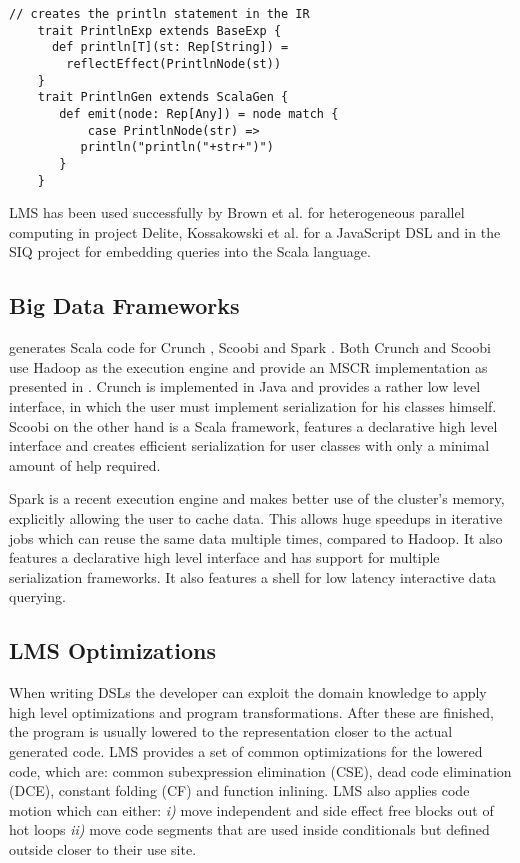 \begin{lstlisting}[name=code, caption=Example of how the DSL module is specified. This module is used for measuring a performance of a block of code and can be reused in any other Scala backed DSL. ,captionpos=b, label=lst:println_dsl, float=t]
    // creates the println statement in the IR
    trait PrintlnExp extends BaseExp {
      def println[T](st: Rep[String]) =
        reflectEffect(PrintlnNode(st)) 
    }
    trait PrintlnGen extends ScalaGen {
       def emit(node: Rep[Any]) = node match {
           case PrintlnNode(str) =>
	      println("println("+str+")")
       }
    }
\end{lstlisting}

LMS has been used successfully by Brown et al. for heterogeneous parallel computing in project Delite\cite{brown_heterogeneous_2011}, Kossakowski et al. for a JavaScript DSL  and in the SIQ project for embedding queries into the Scala language.
\subsection{Big Data Frameworks}
\label{subsed:big-data-frameworks}
\tool generates Scala code for Crunch \cite{_crunch_2012}, Scoobi \cite{nicta_scoobi_2012} and Spark \cite{matei_spark_????}. Both Crunch and Scoobi use Hadoop as the execution engine and provide an MSCR implementation as presented in \cite{chambers_flumejava:_2010}. Crunch is implemented in Java and provides a rather low level interface, in which the user must implement serialization for his classes himself. Scoobi on the other hand is a Scala framework, features a declarative high level interface and creates efficient serialization for user classes with only a minimal amount of help required. 

Spark is a recent execution engine and makes better use of the cluster's memory, explicitly allowing the user to cache data. This allows huge speedups in iterative jobs which can reuse the same data multiple times, compared to Hadoop. It also features a declarative high level interface and has support for multiple serialization frameworks. It also features a shell for low latency interactive data querying.

\subsection{LMS Optimizations}
\label{subsec:lms-optimizations}
When writing DSLs the developer can exploit the domain knowledge to apply high level optimizations and program transformations. After these are finished, the program is usually lowered to the representation closer to the actual generated code. LMS provides a set of common optimizations for the lowered code, which are: common subexpression elimination (CSE), dead code elimination (DCE), constant folding (CF) and function inlining. LMS also applies code motion which can either: \emph{i)} move independent and side effect free blocks out of hot loops \emph{ii)} move code segments that are used inside conditionals but defined outside closer to their use site.   

